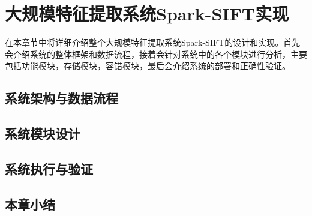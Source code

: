 ﻿\chapter{大规模特征提取系统Spark-SIFT实现}
在本章节中将详细介绍整个大规模特征提取系统Spark-SIFT的设计和实现。首先会介绍系统的整体框架和数据流程，接着会针对系统中的各个模块进行分析，主要包括功能模块，存储模块，容错模块，最后会介绍系统的部署和正确性验证。

\section{系统架构与数据流程}
\section{系统模块设计}
\section{系统执行与验证}
\section{本章小结}